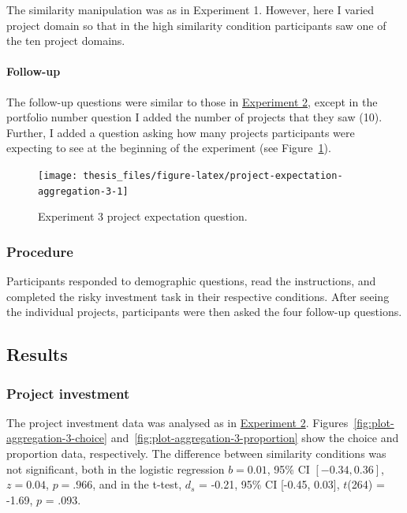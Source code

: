 \documentclass[a4paper, nobind, dvipsnames]{templates/ociamthesis}
\theoremstyle{definition}
\theoremstyle{definition}
\theoremstyle{definition}
\theoremstyle{definition}
\theoremstyle{remark}
\begin{document}
The similarity manipulation was as in Experiment 1. However, here I varied
project domain so that in the high similarity condition participants saw one of
the ten project domains.

\hypertarget{follow-up-aggregation-3}{%
\paragraph{Follow-up}\label{follow-up-aggregation-3}}

The follow-up questions were similar to those in
\protect\hyperlink{follow-up-aggregation-2}{Experiment 2}, except in the portfolio number
question I added the number of projects that they saw (10). Further, I added a
question asking how many projects participants were expecting to see at the
beginning of the experiment (see
Figure~\ref{fig:project-expectation-aggregation-3}).



\begin{figure}
\texttt{[image: thesis\_files/figure-latex/project-expectation-aggregation-3-1]} \caption{Experiment 3 project expectation question.}\label{fig:project-expectation-aggregation-3}
\end{figure}

\hypertarget{procedure-6}{%
\subsubsection{Procedure}\label{procedure-6}}

Participants responded to demographic questions, read the instructions, and
completed the risky investment task in their respective conditions. After seeing
the individual projects, participants were then asked the four follow-up
questions.

\hypertarget{results-4}{%
\subsection{Results}\label{results-4}}

\hypertarget{project-investment-1}{%
\subsubsection{Project investment}\label{project-investment-1}}

The project investment data was analysed as in
\protect\hyperlink{results-aggregation-2}{Experiment 2}.
Figures~\ref{fig:plot-aggregation-3-choice}
and~\ref{fig:plot-aggregation-3-proportion} show the choice and proportion
data, respectively. The difference between similarity conditions was not
significant, both in the logistic regression
\(b = 0.01\), 95\% CI \([-0.34, 0.36]\), \(z = 0.04\), \(p = .966\), and in the t-test,
\(d_s\) = -0.21, 95\% CI {[}-0.45, 0.03{]}, \(t\)(264) = -1.69, \(p\) = .093.
\end{document}

